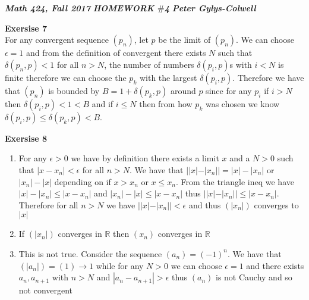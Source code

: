 \documentclass[12pt]{article}
\newenvironment{ques}[1]{\textbf{Exersise #1}\vspace{1 mm}\\ }{\bigskip}
\theoremstyle{definition}
\newcommand{\R}{\mathbb R}
\begin{document}
\noindent \textit{\textbf{Math 424, Fall 2017}} \hspace{1.3cm}
\textit{\textbf{HOMEWORK $\#$4}} \hspace{1.3cm} \textit{\textbf{Peter
Gylys-Colwell}} 

\vspace{1cm}

\begin{ques}{7}
	For any convergent sequence $(p_n)$, let $p$ be the limit of $(p_n)$. We
	can choose $\epsilon = 1$ and from the definition of convergent there
	exists $N$ such that $\delta(p_n,p) < 1$ for all $n > N$, the number of
	numbers $\delta(p_i, p)$s with $i < N$ is finite therefore we  can choose
	the $p_k$ with the largest $\delta(p_i,p)$. Therefore we have that $(p_n)$
	is bounded by $B = 1 + \delta(p_k, p)$ around $p$ since for any $p_i$ if $i >
	N$ then $\delta(p_i,p) < 1 < B$ and if $i \leq N$ then from how $p_k$ was
	chosen we know $\delta(p_i,p) \leq \delta(p_k,p) < B$.
\end{ques}

\begin{ques}{8}
\begin{enumerate}
	\item 
		For any $\epsilon > 0$ we have by definition there exists a limit $x$
		and a $N >0$ such that $|x - x_n| < \epsilon$ for all $n > N$. We have
		that $||x| - |x_n|| = |x| - |x_n|$ or $|x_n| - |x|$ depending on if $x
		> x_n$ or $x \leq x_n$. From the triangle ineq we have $|x| - |x_n|
		\leq |x - x_n|$ and $|x_n| - |x| \leq |x - x_n|$ thus $||x| - |x_n||
		\leq |x - x_n|$. Therefore for all $n > N$ we have $||x| - |x_n|| <
		\epsilon$ and thus $(|x_n|)$ converges to $|x|$
	\item
		If $(|x_n|)$ converges in $\R$ then $(x_n)$ converges in $\R$
	\item
		This is not true. Consider the sequence $(a_n) = (-1)^n$. We have that
		$(|a_n|) = (1) \to 1$ while for any $N >0$ we can choose $\epsilon = 1$
		and there exists $a_n, a_{n+1}$ with $n > N$ and $|a_n - a_{n+1}| >
		\epsilon$ thus $(a_n)$ is not Cauchy and so not convergent
\end{enumerate}
\end{ques}
\end{document}

